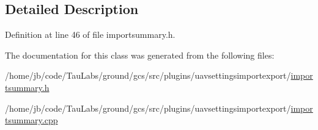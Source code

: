 \subsection{\-Detailed \-Description}


\-Definition at line 46 of file importsummary.\-h.



\-The documentation for this class was generated from the following files\-:\begin{DoxyCompactItemize}
\item 
/home/jb/code/\-Tau\-Labs/ground/gcs/src/plugins/uavsettingsimportexport/\hyperlink{importsummary_8h}{importsummary.\-h}\item 
/home/jb/code/\-Tau\-Labs/ground/gcs/src/plugins/uavsettingsimportexport/\hyperlink{importsummary_8cpp}{importsummary.\-cpp}\end{DoxyCompactItemize}
